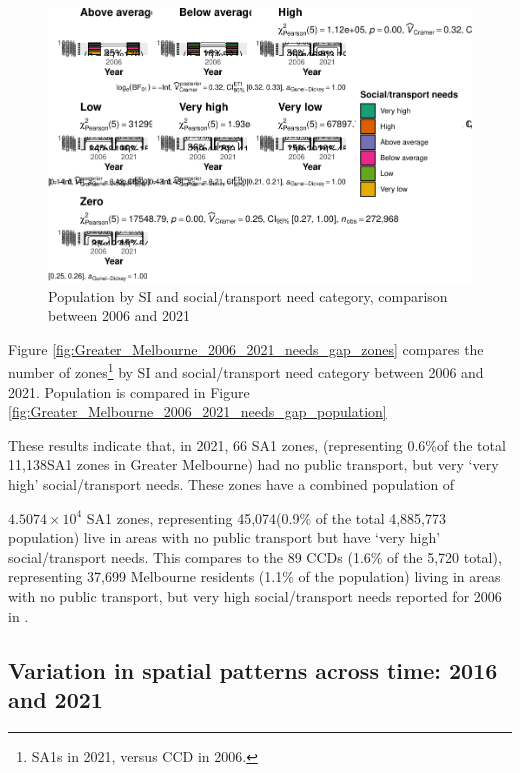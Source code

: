 \documentclass[preprint, 3p,
authoryear]{elsarticle} %
\begin{document}
\begin{figure}
\centering
\includegraphics{Leveraging_GTFS_to_assess_transit_supply_Transport_Geography_files/figure-latex/Greater_Melbourne_2006_2021_needs_gap_population-1.pdf}
\caption{Population by SI and social/transport need category, comparison
between 2006 and 2021}
\end{figure}

Figure \ref{fig:Greater_Melbourne_2006_2021_needs_gap_zones} compares
the number of zones\footnote{SA1s in 2021, versus CCD in 2006.} by SI
and social/transport need category between 2006 and 2021. Population is
compared in Figure
\ref{fig:Greater_Melbourne_2006_2021_needs_gap_population}

These results indicate that, in 2021, 66 SA1 zones, (representing
0.6\%of the total 11,138SA1 zones in Greater Melbourne) had no public
transport, but very `very high' social/transport needs. These zones have
a combined population of

\ensuremath{4.5074\times 10^{4}} SA1 zones, representing 45,074(0.9\% of
the total 4,885,773 population) live in areas with no public transport
but have `very high' social/transport needs. This compares to the 89
CCDs (1.6\% of the 5,720 total), representing 37,699 Melbourne residents
(1.1\% of the population) living in areas with no public transport, but
very high social/transport needs reported for 2006 in
\citet{currie2010identifying}.

\subsection{Variation in spatial patterns across time: 2016 and
2021}\label{variation-in-spatial-patterns-across-time-2016-and-2021}
\end{document}
